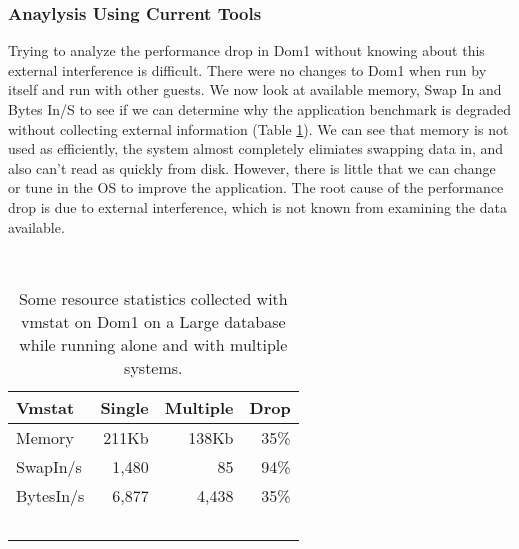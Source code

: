 \subsubsection{Anaylysis Using Current Tools}
\indent Trying to analyze the performance drop in Dom1 without knowing about this external interference is difficult.  There were no changes to Dom1 when run by itself and run with other guests.  We now look at available memory, Swap In and Bytes In/S to see if we can determine why the application benchmark is degraded without collecting external information (Table \ref{fig:vmstat}).  We can see that memory is not used as efficiently, the system almost completely elimiates swapping data in, and also can't read as quickly from disk.  However, there is little that we can change or tune in the OS to improve the application.  The root cause of the performance drop is due to external interference, which is not known from examining the data available.
\begin{table}
  \begin{tabular}{ l | r | r | r }
    Vmstat & Single & Multiple & Drop \\ \hline
	Memory & 211Kb & 138Kb & 35\% \\
	SwapIn/s & 1,480 & 85 & 94\% \\
	BytesIn/s & 6,877 & 4,438 & 35\% \\
  \end{tabular}
\caption{Some resource statistics collected with vmstat on Dom1 on a Large database while running alone and with multiple systems.} 
\label{fig:vmstat}
\end{table}




